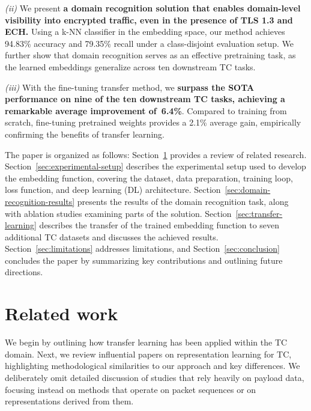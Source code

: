 \documentclass[lettersize,journal,twoside,article]{IEEEtran}
\newcommand{\secref}[1]{Section~\ref{#1}}
\begin{document}
\smallskip
\textit{(ii)} We present \textbf{a domain recognition solution that enables domain-level visibility into encrypted traffic, even in the presence of TLS 1.3 and ECH.} Using a k-NN classifier in the embedding space, our method achieves 94.83\% accuracy and 79.35\% recall under a class-disjoint evaluation setup. We further show that domain recognition serves as an effective pretraining task, as the learned embeddings generalize across ten downstream TC tasks.

\smallskip
\textit{(iii)} With the fine-tuning transfer method, we \textbf{surpass the SOTA performance on nine of the ten downstream TC tasks, achieving a remarkable average improvement of~6.4\%}. Compared to training from scratch, fine-tuning pretrained weights provides a 2.1\% average gain, empirically confirming the benefits of transfer learning.

\medskip
\noindent
The paper is organized as follows: \secref{sec:related-work} provides a review of related research. \secref{sec:experimental-setup} describes the experimental setup used to develop the embedding function, covering the dataset, data preparation, training loop, loss function, and deep learning (DL) architecture. \secref{sec:domain-recognition-results} presents the results of the domain recognition task, along with ablation studies examining parts of the solution. \secref{sec:transfer-learning} describes the transfer of the trained embedding function to seven additional TC datasets and discusses the achieved results. \secref{sec:limitations} addresses limitations, and \secref{sec:conclusion} concludes the paper by summarizing key contributions and outlining future directions.

\section{Related work}
\label{sec:related-work}
We begin by outlining how transfer learning has been applied within the TC domain. Next, we review influential papers on representation learning for TC, highlighting methodological similarities to our approach and key differences. We deliberately omit detailed discussion of studies that rely heavily on payload data, focusing instead on methods that operate on packet sequences or on representations derived from them.
\end{document}
